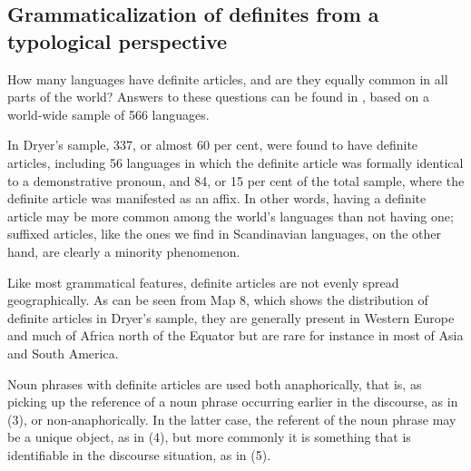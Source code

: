 
\subsection{ Grammaticalization of definites from a typological perspective}
\label{bkm:Ref218335964}\label{bkm:Ref218335969}
How many languages have  definite articles, and are they equally common in all parts of the world? Answers to these questions can be found in \citet{Dryer2005}, based on a world-wide sample of 566 languages. 


In Dryer’s sample, 337, or almost 60 per cent, were found to have definite articles, including 56 languages in which the definite article was formally identical to a demonstrative pronoun, and 84, or 15 per cent of the total sample, where the definite article was manifested as an affix. In other words, having a definite article may be more common among the world’s languages than not having one; suffixed articles, like the ones we find in Scandinavian languages, on the other hand, are clearly a minority phenomenon. 


Like most grammatical features, definite articles are not evenly spread geographically. As can be seen from Map 8, which shows the distribution of definite articles in Dryer’s sample, they are generally present in Western Europe and much of Africa north of the Equator but are rare for instance in most of Asia and South America.


Noun phrases with definite articles are used both anaphorically, that is, as picking up the reference of a noun phrase occurring earlier in the discourse, as in (3), or non-anaphorically. In the latter case, the referent of the noun phrase may be a unique object, as in (4), but more commonly it is something that is identifiable in the discourse situation, as in (5).


